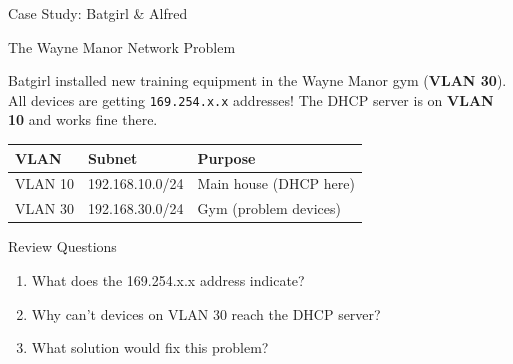 \documentclass[aspectratio=169, 11pt]{beamer}
\newenvironment{casestudy}[1]{%
    \begin{alertblock}{#1}
}{\end{alertblock}}
\begin{document}
\begin{frame}{Case Study: Batgirl \& Alfred}
    \begin{casestudy}{The Wayne Manor Network Problem}
        \small
        Batgirl installed new training equipment in the Wayne Manor gym (\textbf{VLAN 30}). All devices are getting \texttt{169.254.x.x} addresses! The DHCP server is on \textbf{VLAN 10} and works fine there.
        
        \vspace{0.2em}
        \footnotesize
        \begin{center}
            \begin{tabular}{l l l}
                \toprule
                \textbf{VLAN} & \textbf{Subnet} & \textbf{Purpose} \\
                \midrule
                VLAN 10 & 192.168.10.0/24 & Main house (DHCP here) \\
                VLAN 30 & 192.168.30.0/24 & Gym (problem devices) \\
                \bottomrule
            \end{tabular}
        \end{center}
    \end{casestudy}
    
    \begin{block}{Review Questions}
        \small
        \begin{enumerate}\setlength{\itemsep}{1pt}
            \item What does the 169.254.x.x address indicate?
            \item Why can't devices on VLAN 30 reach the DHCP server?
            \item What solution would fix this problem?
        \end{enumerate}
    \end{block}
\end{frame}
\end{document}
